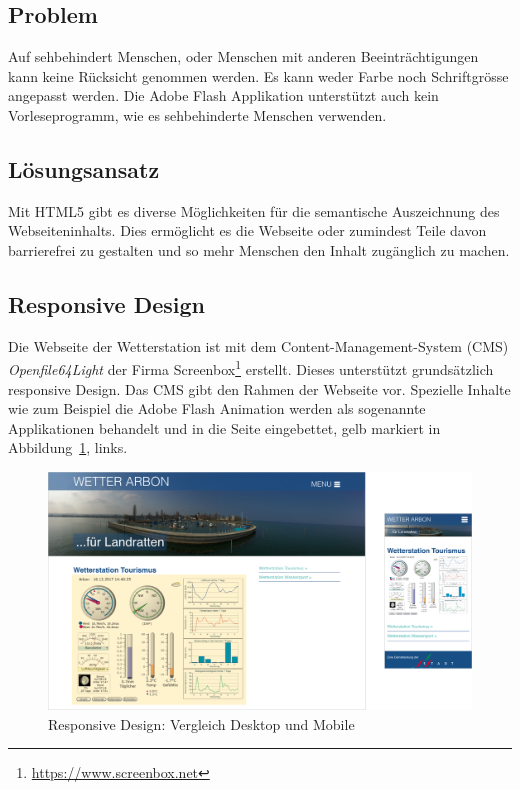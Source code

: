 \subsection*{Problem}
Auf sehbehindert Menschen, oder Menschen mit anderen Beeinträchtigungen kann keine Rücksicht genommen werden. Es kann weder Farbe noch Schriftgrösse angepasst werden. Die Adobe Flash Applikation unterstützt auch kein Vorleseprogramm, wie es sehbehinderte Menschen verwenden.

\subsection*{Lösungsansatz}
Mit HTML5 gibt es diverse Möglichkeiten für die semantische Auszeichnung des Webseiteninhalts. Dies ermöglicht es die Webseite oder zumindest Teile davon barrierefrei zu gestalten und so mehr Menschen den Inhalt zugänglich zu machen.



\subsection{Responsive Design}
Die Webseite der Wetterstation ist mit dem Content-Management-System (CMS) \textit{Openfile64Light} der Firma Screenbox\footnote{ \url{https://www.screenbox.net}}  erstellt. Dieses unterstützt grundsätzlich responsive Design. Das CMS gibt den Rahmen der Webseite vor. Spezielle Inhalte wie zum Beispiel die Adobe Flash Animation werden als sogenannte Applikationen behandelt und in die Seite eingebettet, gelb markiert in Abbildung~\ref{img:responsive}, links.

\begin{figure}[h!]
	\centering
	\includegraphics[width=1\linewidth]{img/responsive}
	\caption{Responsive Design: Vergleich Desktop und Mobile}
	\label{img:responsive}
\end{figure}


